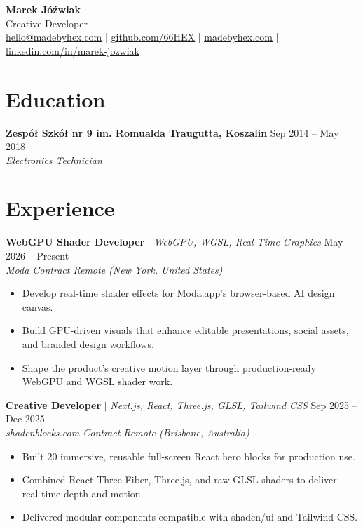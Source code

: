 \documentclass[10pt,a4paper]{article}
\let\oldhref\href
\renewcommand{\href}[2]{\oldhref{#1}{\uline{#2}}}
\begin{document}
\begin{center}
  {\huge \textbf{Marek Jóźwiak}}\\[4pt]
  {\large Creative Developer}\\[8pt]
  \small
  \href{mailto:hello@madebyhex.com}{hello@madebyhex.com}
  \quad|\quad
  \href{https://github.com/66HEX}{github.com/66HEX}
  \quad|\quad
  \href{https://www.madebyhex.com/}{madebyhex.com}
  \quad|\quad
  \href{https://www.linkedin.com/in/marek-j\%C3\%B3\%C5\%BAwiak-29958132a/}{linkedin.com/in/marek-jozwiak}
\end{center}

\section{Education}

\textbf{Zespół Szkół nr 9 im. Romualda Traugutta, Koszalin} \hfill Sep 2014 -- May 2018\\
\textit{Electronics Technician}

\section{Experience}

\textbf{WebGPU Shader Developer} $|$ \textit{WebGPU, WGSL, Real-Time Graphics} \hfill May 2026 -- Present\\
\textit{Moda \textbar{} Contract \textbar{} Remote (New York, United States)}
\begin{itemize}
  \item Develop real-time shader effects for Moda.app's browser-based AI design canvas.
  \item Build GPU-driven visuals that enhance editable presentations, social assets, and branded design workflows.
  \item Shape the product's creative motion layer through production-ready WebGPU and WGSL shader work.
\end{itemize}

\textbf{Creative Developer} $|$ \textit{Next.js, React, Three.js, GLSL, Tailwind CSS} \hfill Sep 2025 -- Dec 2025\\
\textit{shadcnblocks.com \textbar{} Contract \textbar{} Remote (Brisbane, Australia)}
\begin{itemize}
  \item Built 20 immersive, reusable full-screen React hero blocks for production use.
  \item Combined React Three Fiber, Three.js, and raw GLSL shaders to deliver real-time depth and motion.
  \item Delivered modular components compatible with shadcn/ui and Tailwind CSS.
\end{itemize}
\end{document}
